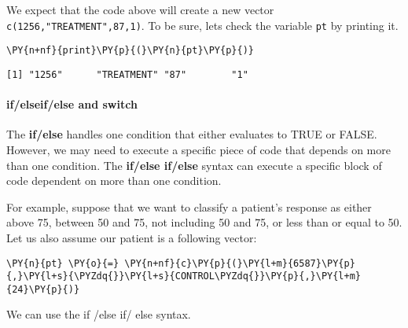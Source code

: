     We expect that the code above will create a new vector
\texttt{c(1256,"TREATMENT",87,1)}. To be sure, lets check the variable
\texttt{pt} by printing it.

    \begin{tcolorbox}[breakable, size=fbox, boxrule=1pt, pad at break*=1mm,colback=cellbackground, colframe=cellborder]
\begin{Verbatim}[commandchars=\\\{\}]
\PY{n+nf}{print}\PY{p}{(}\PY{n}{pt}\PY{p}{)}
\end{Verbatim}
\end{tcolorbox}

    \begin{Verbatim}[commandchars=\\\{\}]
[1] "1256"      "TREATMENT" "87"        "1"
    \end{Verbatim}

    \hypertarget{ifelseifelse-and-switch}{%
\paragraph{if/elseif/else and switch}\label{ifelseifelse-and-switch}}

The \textbf{if/else} handles one condition that either evaluates to TRUE
or FALSE. However, we may need to execute a specific piece of code that
depends on more than one condition. The \textbf{if/else if/else} syntax
can execute a specific block of code dependent on more than one
condition.

For example, suppose that we want to classify a patient's response as
either above 75, between 50 and 75, not including 50 and 75, or less
than or equal to 50. Let us also assume our patient is a following
vector:

    \begin{tcolorbox}[breakable, size=fbox, boxrule=1pt, pad at break*=1mm,colback=cellbackground, colframe=cellborder]
\begin{Verbatim}[commandchars=\\\{\}]
\PY{n}{pt} \PY{o}{=} \PY{n+nf}{c}\PY{p}{(}\PY{l+m}{6587}\PY{p}{,}\PY{l+s}{\PYZdq{}}\PY{l+s}{CONTROL\PYZdq{}}\PY{p}{,}\PY{l+m}{24}\PY{p}{)}
\end{Verbatim}
\end{tcolorbox}

    We can use the if /else if/ else syntax.

